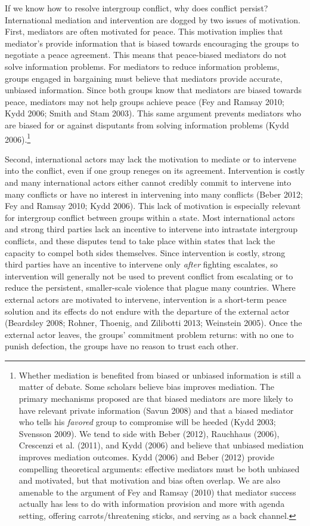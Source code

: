 \documentclass[11pt]{article}
\begin{document}
If we know how to resolve intergroup conflict, why does conflict
persist? International mediation and intervention are dogged by two
issues of motivation. First, mediators are often motivated for peace.
This motivation implies that mediator's provide information that is
biased towards encouraging the groups to negotiate a peace agreement.
This means that peace-biased mediators do not solve information
problems. For mediators to reduce information problems, groups engaged
in bargaining must believe that mediators provide accurate, unbiased
information. Since both groups know that mediators are biased towards
peace, mediators may not help groups achieve peace (Fey and Ramsay 2010;
Kydd 2006; Smith and Stam 2003). This same argument prevents mediators
who are biased for or against disputants from solving information
problems (Kydd 2006).\footnote{Whether mediation is benefited from
  biased or unbiased information is still a matter of debate. Some
  scholars believe bias improves mediation. The primary mechanisms
  proposed are that biased mediators are more likely to have relevant
  private information (Savun 2008) and that a biased mediator who tells
  his \emph{favored} group to compromise will be heeded (Kydd 2003;
  Svensson 2009). We tend to side with Beber (2012), Rauchhaus (2006),
  Crescenzi et al. (2011), and Kydd (2006) and believe that unbiased
  mediation improves mediation outcomes. Kydd (2006) and Beber (2012)
  provide compelling theoretical arguments: effective mediators must be
  both unbiased and motivated, but that motivation and bias often
  overlap. We are also amenable to the argument of Fey and Ramsay (2010)
  that mediator success actually has less to do with information
  provision and more with agenda setting, offering carrots/threatening
  sticks, and serving as a back channel.}

Second, international actors may lack the motivation to mediate or to
intervene into the conflict, even if one group reneges on its agreement.
Intervention is costly and many international actors either cannot
credibly commit to intervene into many conflicts or have no interest in
intervening into many conflicts (Beber 2012; Fey and Ramsay 2010; Kydd
2006). This lack of motivation is especially relevant for intergroup
conflict between groups within a state. Most international actors and
strong third parties lack an incentive to intervene into intrastate
intergroup conflicts, and these disputes tend to take place within
states that lack the capacity to compel both sides themselves. Since
intervention is costly, strong third parties have an incentive to
intervene only \emph{after} fighting escalates, so intervention will
generally not be used to prevent conflict from escalating or to reduce
the persistent, smaller-scale violence that plague many countries. Where
external actors are motivated to intervene, intervention is a short-term
peace solution and its effects do not endure with the departure of the
external actor (Beardsley 2008; Rohner, Thoenig, and Zilibotti 2013;
Weinstein 2005). Once the external actor leaves, the groups' commitment
problem returns: with no one to punish defection, the groups have no
reason to trust each other.
\end{document}

